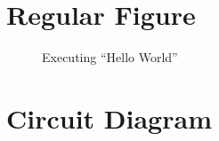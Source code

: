 \section{Regular Figure}
\begin{figure}[H]
  \centering
  \caption{Executing ``Hello World''}
  \label{lab01:fig:executing_hello_world}
\end{figure}

\section{Circuit Diagram}
